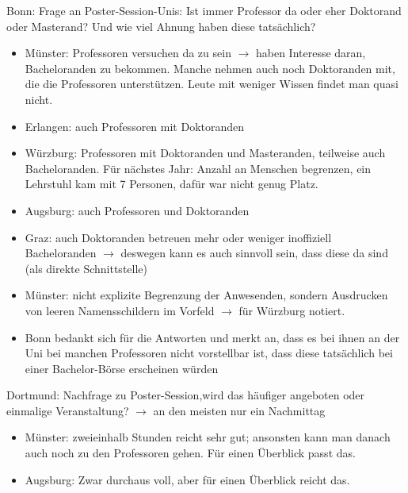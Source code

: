     Bonn: Frage an Poster-Session-Unis: Ist immer Professor da oder eher Doktorand oder Masterand? Und wie viel Ahnung haben diese tatsächlich?
    \begin{itemize}
      \item Münster: Professoren versuchen da zu sein $\rightarrow$ haben Interesse daran, Bacheloranden zu bekommen. Manche nehmen auch noch Doktoranden mit, die die Professoren unterstützen. Leute mit weniger Wissen findet man quasi nicht.
      \item Erlangen: auch Professoren mit Doktoranden
      \item Würzburg: Professoren mit Doktoranden und Masteranden, teilweise auch Bacheloranden. Für nächstes Jahr: Anzahl an Menschen begrenzen, ein Lehrstuhl kam mit 7 Personen, dafür war nicht genug Platz.
      \item Augsburg: auch Professoren und Doktoranden
      \item Graz: auch Doktoranden betreuen mehr oder weniger inoffiziell Bacheloranden $\rightarrow$ deswegen kann es auch sinnvoll sein, dass diese da sind (als direkte Schnittstelle)
      \item Münster: nicht explizite Begrenzung der Anwesenden, sondern Ausdrucken von leeren Namensschildern im Vorfeld $\rightarrow$ für Würzburg notiert.
      \item Bonn bedankt sich für die Antworten und merkt an, dass es bei ihnen an der Uni bei manchen Professoren nicht vorstellbar ist, dass diese tatsächlich bei einer Bachelor-Börse erscheinen würden

    \end{itemize}

    Dortmund: Nachfrage zu Poster-Session,wird das häufiger angeboten oder einmalige Veranstaltung?
    $\rightarrow$ an den meisten nur ein Nachmittag
    \begin{itemize}
      \item Münster: zweieinhalb Stunden reicht sehr gut; ansonsten kann man danach auch noch zu den Professoren gehen. Für einen Überblick passt das.
      \item Augsburg: Zwar durchaus voll, aber für einen Überblick reicht das.
    \end{itemize}


